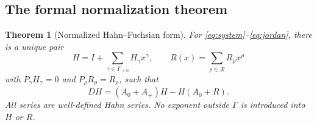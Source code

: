 \documentclass[11pt,a4paper]{article}
\numberwithin{equation}{section}
\newtheorem{theorem}{Theorem}[section]
\theoremstyle{definition}
\theoremstyle{remark}
\newcommand{\G}{\Gamma}
\newcommand{\Res}{\mathcal R}
\newcommand{\Aplus}{A_{+}}
\begin{document}
\subsection{The formal normalization theorem}
\begin{theorem}[Normalized Hahn--Fuchsian form]\label{thm:normal}
For \eqref{eq:system}--\eqref{eq:jordan}, there is a unique pair
\begin{equation}\label{eq:HR}
 H=I+\sum_{\gamma\in\G_{>0}}H_\gamma x^\gamma,
 \qquad R(x)=\sum_{\rho\in\Res}R_\rho x^\rho
\end{equation}
with $P_\gamma H_\gamma=0$ and $P_\rho R_\rho=R_\rho$, such that
\begin{equation}\label{eq:gauge}
 DH=(A_0+\Aplus)H-H(A_0+R).
\end{equation}
All series are well-defined Hahn series. No exponent outside $\G$ is
introduced into $H$ or $R$.
\end{theorem}
\end{document}
